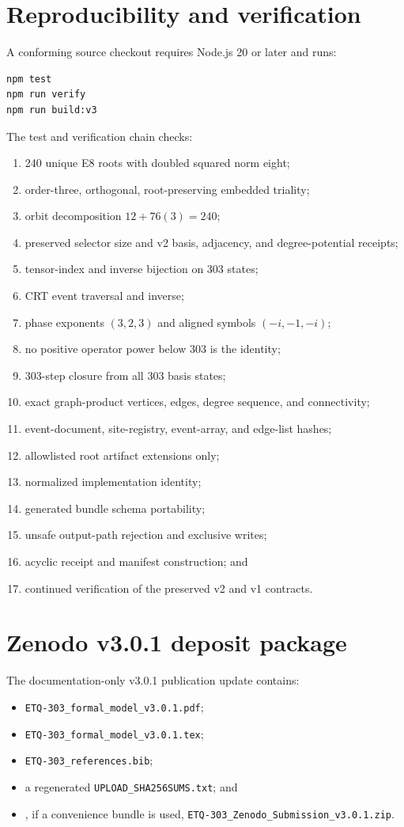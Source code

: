 \documentclass[11pt,a4paper]{article}
\theoremstyle{definition}
\begin{document}
\section{Reproducibility and verification}
A conforming source checkout requires Node.js 20 or later and runs:
\begin{lstlisting}[language=bash]
npm test
npm run verify
npm run build:v3
\end{lstlisting}
The test and verification chain checks:
\begin{enumerate}
\item 240 unique E8 roots with doubled squared norm eight;
\item order-three, orthogonal, root-preserving embedded triality;
\item orbit decomposition $12+76(3)=240$;
\item preserved selector size and v2 basis, adjacency, and degree-potential receipts;
\item tensor-index and inverse bijection on 303 states;
\item CRT event traversal and inverse;
\item phase exponents $(3,2,3)$ and aligned symbols $(-i,-1,-i)$;
\item no positive operator power below 303 is the identity;
\item 303-step closure from all 303 basis states;
\item exact graph-product vertices, edges, degree sequence, and connectivity;
\item event-document, site-registry, event-array, and edge-list hashes;
\item allowlisted root artifact extensions only;
\item normalized implementation identity;
\item generated bundle schema portability;
\item unsafe output-path rejection and exclusive writes;
\item acyclic receipt and manifest construction; and
\item continued verification of the preserved v2 and v1 contracts.
\end{enumerate}

\section{Zenodo v3.0.1 deposit package}
The documentation-only v3.0.1 publication update contains:
\begin{itemize}
\item \texttt{ETQ-303\_formal\_model\_v3.0.1.pdf};
\item \texttt{ETQ-303\_formal\_model\_v3.0.1.tex};
\item \texttt{ETQ-303\_references.bib};
\item a regenerated \texttt{UPLOAD\_SHA256SUMS.txt}; and
\item, if a convenience bundle is used, \texttt{ETQ-303\_Zenodo\_Submission\_v3.0.1.zip}.
\end{itemize}
\end{document}
